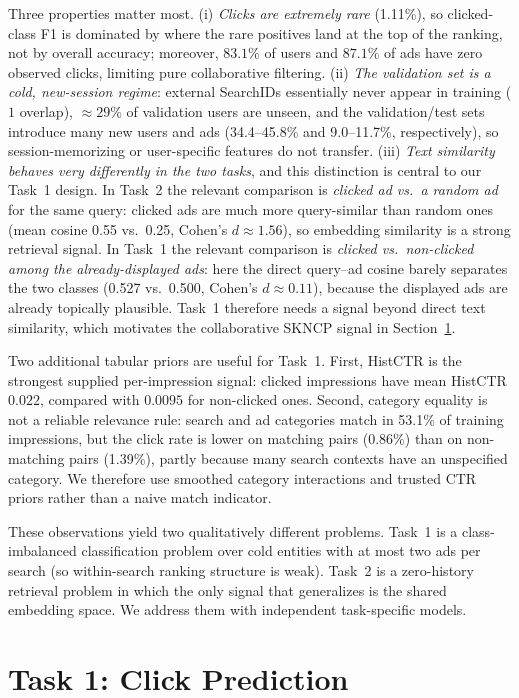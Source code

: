 \documentclass[sigconf, nonacm]{acmart}
\begin{document}
Three properties matter most. (i) \emph{Clicks are extremely rare} (1.11\%),
so clicked-class F1 is dominated by where the rare positives land at the top of
the ranking, not by overall accuracy; moreover, $83.1\%$ of users and $87.1\%$
of ads have zero observed clicks, limiting pure collaborative filtering.
(ii) \emph{The validation set is a cold, new-session regime}: external SearchIDs
essentially never appear in training ($1$ overlap), $\approx29\%$ of validation
users are unseen, and the validation/test sets introduce many new users and ads
(34.4--45.8\% and 9.0--11.7\%, respectively), so session-memorizing or
user-specific features do not transfer. (iii) \emph{Text
similarity behaves very differently in the two tasks}, and this distinction is
central to our Task~1 design. In Task~2 the relevant comparison is
\emph{clicked ad vs.\ a random ad} for the same query: clicked ads are much more
query-similar than random ones (mean cosine 0.55 vs.\ 0.25, Cohen's
$d\!\approx\!1.56$), so embedding
similarity is a strong retrieval signal. In Task~1 the relevant comparison is
\emph{clicked vs.\ non-clicked among the already-displayed ads}: here the direct
query--ad cosine barely separates the two classes (0.527 vs.\ 0.500, Cohen's
$d\!\approx\!0.11$),
because the displayed ads are already topically plausible. Task~1 therefore
needs a signal beyond direct text similarity, which motivates the collaborative
SKNCP signal in Section~\ref{sec:task1}.

Two additional tabular priors are useful for Task~1. First, HistCTR is the
strongest supplied per-impression signal: clicked impressions have mean HistCTR
$0.022$, compared with $0.0095$ for non-clicked ones. Second, category equality
is not a reliable relevance rule: search and ad categories match in 53.1\% of
training impressions, but the click rate is lower on matching pairs (0.86\%)
than on non-matching pairs (1.39\%), partly because many search contexts have an
unspecified category. We therefore use smoothed category interactions and
trusted CTR priors rather than a naive match indicator.

These observations yield two qualitatively different problems. Task~1 is a
class-imbalanced classification problem over cold entities with at most two ads
per search (so within-search ranking structure is weak). Task~2 is a
zero-history retrieval problem in which the only signal that generalizes is the
shared embedding space. We address them with independent task-specific models.

\section{Task 1: Click Prediction}
\label{sec:task1}
\end{document}
